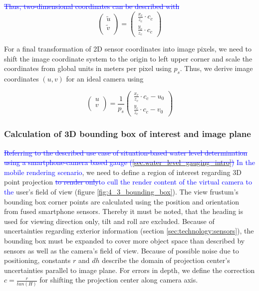 \documentclass[review]{elsarticle}
\begin{document}
\textcolor{blue}{
\sout{Thus, two-dimensional coordinates can be described with}
}
\begin{equation}
\begin{pmatrix}
\tilde{u}\\
\tilde{v}\\
\end{pmatrix}
= \begin{pmatrix}
\frac{x_c}{z_c} \cdot c_c \\
\frac{y_c}{z_c}\cdot c_c
\end{pmatrix}
\label{eq:ut_vt}
\end{equation}

For a final transformation of 2D sensor coordinates into image pixels, we need to shift the image coordinate system to the origin to left upper corner and scale the coordinates from global units in meters per pixel using $p_s$. Thus, we derive image coordinates $(u,v)$ for an ideal camera using

\begin{equation}
\begin{pmatrix}
u\\
v\\
\end{pmatrix}
= \frac{1}{p_s}
\begin{pmatrix}
\frac{x_c}{z_c} \cdot c_c  - {u}_0 \\
\frac{y_c}{z_c}\cdot c_c  - {v}_0 
\end{pmatrix}
\label{eq:final_ps}
\end{equation}


\subsubsection{Calculation of 3D bounding box of interest and image plane}
\textcolor{blue}{\sout{Referring to the described use case of situation-based water level determination using a smartphone-camera based gauge (\ref{sec:water_level_gauging_intro})} In the mobile rendering scenario}, we need to define a region of interest regarding 3D point projection \textcolor{blue}{\sout{to render only}to cull the render content of the virtual camera to the} user's field of view (figure \ref{fig:4_3_bounding_box}). The view frustum's bounding box corner points are calculated using the position and orientation from fused smartphone sensors. Thereby it must be noted, that the heading is used for viewing direction only, tilt and roll are excluded. Because of uncertainties regarding exterior information (section \ref{sec:technology:sensors}), the bounding box must be expanded to cover more object space than described by sensors as well as the camera's field of view. Because of possible noise due to positioning, constants $r$ and $dh$ describe the domain of projection center's uncertainties parallel to image plane. For errors in depth, we define the correction $c = \frac{r}{tan(H)}$ for shifting the projection center along camera axis. 
\end{document}
